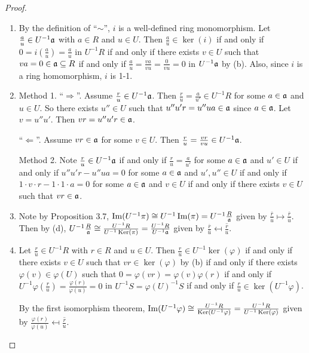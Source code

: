 \begin{proof}
    \begin{enumerate}
        \item By the definition of ``$\sim$'', $i$ is a well-defined ring monomorphism. Let $\frac{a}{u} \in U^{-1}\mathfrak{a}$ with $a \in R$ and $u \in U$. Then $\frac{a}{u} \in \ker(i)$ if and only if $0 = i(\frac{a}{u}) = \frac{a}{u}$ in $U^{-1}R$ if and only if there exists $v \in U$ such that $va = 0 \in \mathfrak{a} \subseteq R$ if and only if $\frac{a}{u} = \frac{va}{vu} = \frac{0}{vu} = 0$ in $U^{-1}\mathfrak{a}$ by (b). Also, since $i$ is a ring homomorphism, $i$ is 1-1.
        \item Method 1. ``$\Rightarrow$''. Assume $\frac{r}{u} \in U^{-1}\mathfrak{a}$. Then $\frac{r}{u} = \frac{a}{u'} \in U^{-1}R$ for some $a \in \mathfrak{a}$ and $u \in U$. So there exists $u'' \in U$ such that $u''u'r = u''ua \in \mathfrak{a}$ since $a \in \mathfrak{a}$. Let $v = u''u'$. Then $vr = u''u'r \in \mathfrak{a}$. \par 
            ``$\Leftarrow$''. Assume $vr \in \mathfrak{a}$ for some $v \in U$. Then $\frac{r}{u} = \frac{vr}{vu} \in U^{-1}\mathfrak{a}$. \par 
            Method 2. Note $\frac{r}{u} \in U^{-1}\mathfrak{a}$ if and only if $\frac{r}{u} = \frac{a}{u'}$ for some $a \in \mathfrak{a}$ and $u' \in U$ if and only if $u''u'r - u''ua = 0$ for some $a \in \mathfrak{a}$ and $u', u'' \in U$ if and only if $1 \cdot v \cdot r - 1 \cdot 1 \cdot a = 0$ for some $a \in \mathfrak{a}$ and $v \in U$ if and only if there exists $v \in U$ such that $vr \in \mathfrak{a}$. 
        \item Note by Proposition 3.7, $\operatorname{Im}(U^{-1}\pi) \cong U^{-1} \operatorname{Im}(\pi) =  U^{-1}\frac{R}{\mathfrak{a}}$ given by $\frac{\overbar{r}}{\overbar{u}} \mapsto \frac{\overbar{r}}{\overbar{u}}$. Then by (d), $U^{-1} \frac{R}{\mathfrak{a}} \cong \frac{U^{-1}R}{U^{-1}\operatorname{Ker}(\pi)} = \frac{U^{-1}R}{U^{-1}\mathfrak{a}}$ given by $\frac{\overbar{r}}{\overbar{u}} \mapsfrom \overline{\frac{r}{u}}$.
        \item Let $\frac{r}{u} \in U^{-1}R$ with $r \in R$ and $u \in U$. Then $\frac{r}{u} \in U^{-1}\ker(\varphi)$ if and only if there exists $v \in U$ such that $vr \in \ker(\varphi)$ by (b) if and only if there exists $\varphi(v) \in \varphi(U)$ such that $0 = \varphi(vr) = \varphi(v)\varphi(r)$ if and only if $U^{-1}\varphi(\frac{r}{u}) = \frac{\varphi(r)}{\varphi(u)} = 0$ in $U^{-1}S = \varphi(U)^{-1}S$ if and only if $\frac{r}{u} \in \ker(U^{-1}\varphi)$. \par 
            By the first isomorphism theorem, $\operatorname{Im}(U^{-1}\varphi) \cong \frac{U^{-1}R}{\operatorname{Ker}(U^{-1}\varphi)} = \frac{U^{-1}R}{U^{-1}\operatorname{Ker}(\varphi)}$ given by $\frac{\varphi(r)}{\varphi(u)} \mapsfrom \overline{\frac{r}{u}}$.  

\end{enumerate}
\end{proof}
